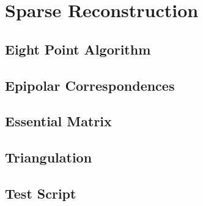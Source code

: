 \section{Sparse Reconstruction}

\subsection{Eight Point Algorithm}

\subsection{Epipolar Correspondences}

\subsection{Essential Matrix}

\subsection{Triangulation}

\subsection{Test Script}
